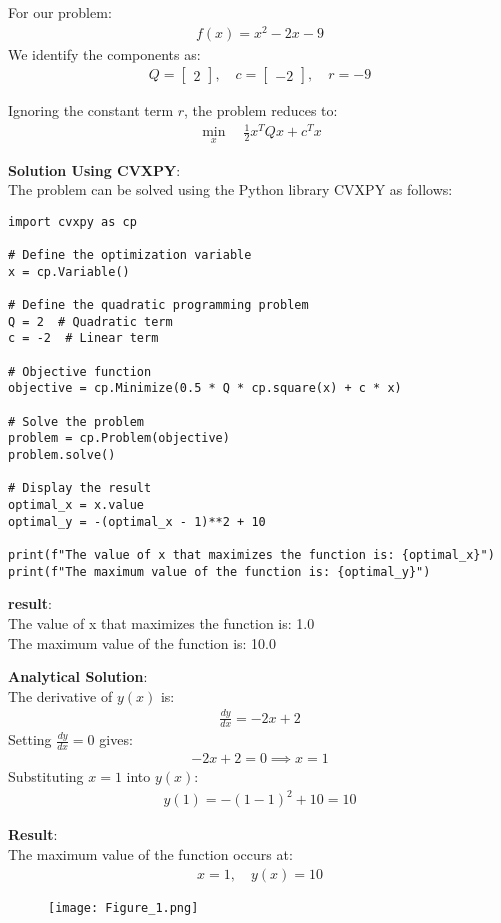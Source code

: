 \documentclass[journal]{IEEEtran}
\begin{document}
For our problem: 
\begin{align}
f(x) = x^2 - 2x - 9
\end{align}
We identify the components as: 
\begin{align}
Q = \begin{bmatrix} 2 \end{bmatrix}, \quad c = \begin{bmatrix} -2 \end{bmatrix}, \quad r = -9
\end{align}

Ignoring the constant term $r$, the problem reduces to: 
\begin{align}
\min_{x} \quad \frac{1}{2} x^T Q x + c^T x
\end{align}

\textbf{Solution Using CVXPY}:\\
The problem can be solved using the Python library CVXPY as follows: 
\begin{verbatim}
import cvxpy as cp

# Define the optimization variable
x = cp.Variable()

# Define the quadratic programming problem
Q = 2  # Quadratic term
c = -2  # Linear term

# Objective function
objective = cp.Minimize(0.5 * Q * cp.square(x) + c * x)

# Solve the problem
problem = cp.Problem(objective)
problem.solve()

# Display the result
optimal_x = x.value
optimal_y = -(optimal_x - 1)**2 + 10

print(f"The value of x that maximizes the function is: {optimal_x}")
print(f"The maximum value of the function is: {optimal_y}")
\end{verbatim}
\textbf{result}:\\
The value of x that maximizes the function is: 1.0\\
The maximum value of the function is: 10.0

\textbf{Analytical Solution}:\\
The derivative of $y(x)$ is: 
\begin{align}
\frac{dy}{dx} = -2x + 2
\end{align}
Setting $\frac{dy}{dx} = 0$ gives: 
\begin{align}
-2x + 2 = 0 \implies x = 1
\end{align}
Substituting $x = 1$ into $y(x)$: 
\begin{align}
y(1) = -(1 - 1)^2 + 10 = 10
\end{align}

\textbf{Result}:\\
The maximum value of the function occurs at: 
\begin{align}
x = 1, \quad y(x) = 10
\end{align}
\begin{figure}[ht!]
   \centering
   \texttt{[image: Figure\_1.png]}
\end{figure}
\end{document}
